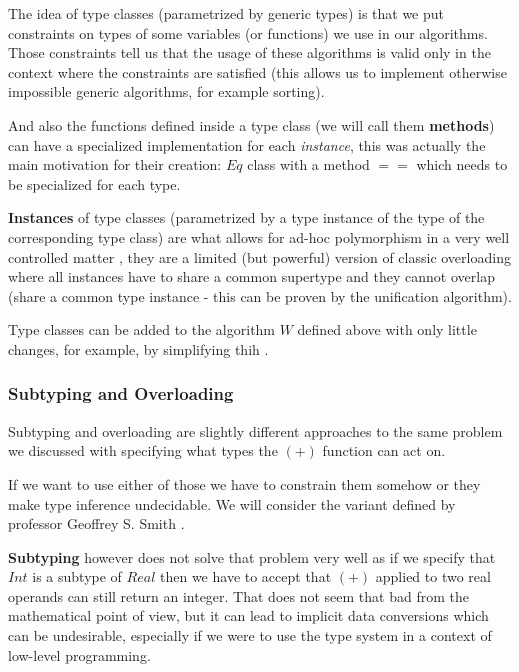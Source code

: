 The idea of type classes (parametrized by generic types) is that we put constraints on types of some variables (or functions) we use in our algorithms. Those constraints tell us that the usage of these algorithms is valid only in the context where the constraints are satisfied (this allows us to implement otherwise impossible generic algorithms, for example sorting).

And also the functions defined inside a type class (we will call them \textbf{methods}) can have a specialized implementation for each \emph{instance}, this was actually the main motivation for their creation: $Eq$ class with a method $==$ which needs to be specialized for each type. \cite{hall1994type}

\textbf{Instances} of type classes (parametrized by a type instance of the type of the corresponding type class) are what allows for ad-hoc polymorphism in a very well controlled matter \cite{wadler1989make}, they are a limited (but powerful) version of classic overloading where all instances have to share a common supertype and they cannot overlap (share a common type instance - this can be proven by the unification algorithm).

Type classes can be added to the algorithm $W$ defined above with only little changes, for example, by simplifying thih \cite{jones1999typing}.

\subsubsection{Subtyping and Overloading}


Subtyping and overloading are slightly different approaches to the same problem we discussed with specifying what types the $(+)$ function can act on.

If we want to use either of those we have to constrain them somehow or they make type inference undecidable. We will consider the variant defined by professor Geoffrey S. Smith \cite{smith1993polymorphic}.

\textbf{Subtyping} however does not solve that problem very well as if we specify that $Int$ is a subtype of $Real$ then we have to accept that $(+)$ applied to two real operands can still return an integer. That does not seem that bad from the mathematical point of view, but it can lead to implicit data conversions which can be undesirable, especially if we were to use the type system in a context of low-level programming.

